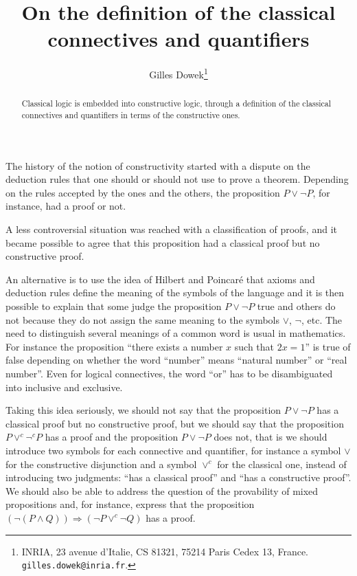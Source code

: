 \documentclass{article}
\newcommand{\negc}{\neg^c}
\newcommand{\veec}{\vee^c}
\begin{document}
\title{On the definition of the classical\\ connectives and quantifiers}
\author{Gilles Dowek\thanks{INRIA, 
23 avenue d'Italie, CS 81321, 75214 Paris Cedex 
13, France.
{\tt gilles.dowek@inria.fr}.}}
\date{}

\maketitle
\thispagestyle{empty}

\begin{abstract}
Classical logic is embedded into constructive logic, through a 
definition of the classical connectives and quantifiers in terms 
of the constructive ones.
\end{abstract}

The history of the notion of constructivity started with a dispute on
the deduction rules that one should or should not use to prove a
theorem. Depending on the rules accepted by the ones and the others,
the proposition $P \vee \neg P$, for instance, had a proof or not.

A less controversial situation was reached with a classification of
proofs, and it became possible to agree that this proposition had a
classical proof but no constructive proof.

An alternative is to use the idea of Hilbert and Poincar\'e that
axioms and deduction rules define the meaning of the symbols of the
language and it is then possible to explain that some judge the
proposition $P \vee \neg P$ true and others do not because they do not
assign the same meaning to the symbols $\vee$, $\neg$, etc. The need
to distinguish several meanings of a common word is usual in
mathematics. For instance the proposition ``there exists a number $x$
such that $2 x = 1$'' is true of false depending on whether the word
``number'' means ``natural number'' or ``real number''. Even for
logical connectives, the word ``or'' has to be disambiguated into
inclusive and exclusive.

Taking this idea seriously, we should not say that the proposition $P
\vee \neg P$ has a classical proof but no constructive proof, but we
should say that the proposition $P \veec \negc P$ has a proof and 
the proposition $P \vee \neg P$ does not, that is we should introduce
two symbols for each connective and quantifier, for instance a symbol
$\vee$ for the constructive disjunction and a symbol $\veec$ for the
classical one, instead of introducing two judgments: ``has a
classical proof'' and ``has a constructive proof''.  We should also be
able to address the question of the provability of mixed propositions
and, for instance, express that the proposition $(\neg (P \wedge Q))
\Rightarrow (\neg P \veec \neg Q)$ has a proof.
\end{document}
